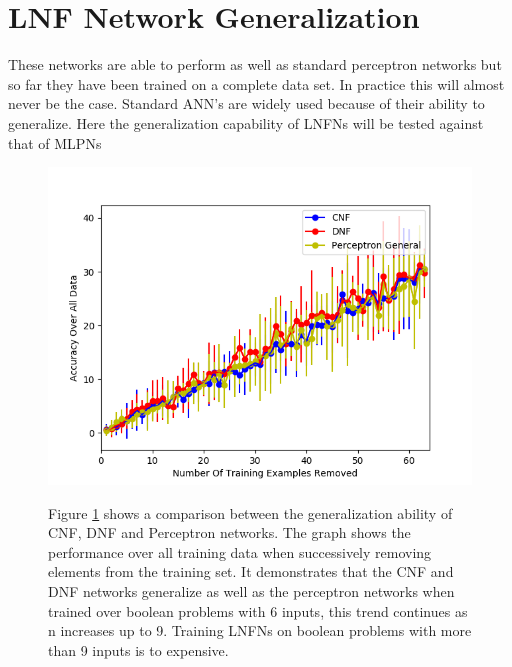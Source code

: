 \section{LNF Network Generalization} \label{sec:lnfn-generalization}
These networks are able to perform as well as standard perceptron networks but so far they have been trained on a complete data set. In practice this will almost never be the case. Standard ANN's are widely used because of their ability to generalize. Here the generalization capability of LNFNs will be tested against that of MLPNs

\begin{figure}[H]
	\centering
	\begin{minipage}[t]{0.6\textwidth}
		\vspace{0px}
		\includegraphics[width=\textwidth]{6-generalization.png}
		\caption{}
		\label{fig:generalization-peformance-6}
	\end{minipage}
	\begin{minipage}[t]{0.39\textwidth}
	\vspace{0px}
		Figure \ref{fig:generalization-peformance-6} shows a comparison between the generalization ability of CNF, DNF and Perceptron networks. The graph shows the performance over all training data when successively removing elements from the training set. It demonstrates that the CNF and DNF networks generalize as well as the perceptron networks when trained over boolean problems with 6 inputs, this trend continues as n increases up to 9. Training LNFNs on boolean problems with more than 9 inputs is to expensive.		
	\end{minipage}
	\hfill
\end{figure}

